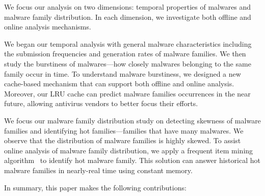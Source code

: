 We focus our analysis on two dimensions: temporal properties of malwares and 
malware family distribution.
In each dimension, we investigate both offline and online analysis mechanisms.

We began our temporal analysis with general malware characteristics including the submission
frequencies and generation rates of malware families. 
We then study the burstiness of malwares---how closely malwares belonging to the same family occur in time. 
To understand malware burstiness, we designed a new cache-based mechanism 
that can support both offline and online analysis.
Moreover, our LRU cache can predict malware families occurrences in the near future, 
allowing antivirus vendors to better focus their efforts. 

We focus our malware family distribution study on detecting skewness of malware families and identifying hot families---families that have many malwares.
We observe that the distribution of malware families is highly skewed. 
To assist online analysis of malware family distribution, 
we apply a frequent item mining algorithm~\cite{space-saving} to identify hot malware family. 
This solution can answer historical hot malware families in nearly-real time using constant memory. 



%


In summary, this paper makes the following contributions:

